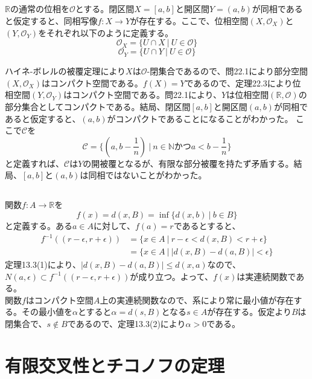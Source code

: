 \documentclass{jsarticle}
\begin{document}
\subsection{}
$\mathbb{R}$の通常の位相を$\mathcal{O}$とする。閉区間$X=[a,b]$と開区間$Y=(a,b)$が同相であると仮定すると、同相写像$f:X\to Y$が存在する。ここで、位相空間$(X,\mathcal{O}_X)$と$(Y,\mathcal{O}_Y)$をそれぞれ以下のように定義する。
\[\mathcal{O}_X=\{U\cap X\ |\ U\in\mathcal{O}\}\]
\[\mathcal{O}_Y=\{U\cap Y\ |\ U\in\mathcal{O}\}\]

ハイネ-ボレルの被覆定理により$X$は$\mathcal{O}$-閉集合であるので、問22.1により部分空間$(X,\mathcal{O}_X)$はコンパクト空間である。$f(X)=Y$であるので、定理22.3により位相空間$(Y,\mathcal{O}_Y)$はコンパクト空間である。問22.1により、$Y$は位相空間$(\mathbb{R},\mathcal{O})$の部分集合としてコンパクトである。結局、閉区間$[a,b]$と開区間$(a,b)$が同相であると仮定すると、$(a,b)$がコンパクトであることになることがわかった。
ここで$\mathcal{C}$を
\[\mathcal{C}=\{(a,b-\frac{1}{n})\ |\ n\in\mathbb{N}かつa<b-\frac{1}{n}\}\]
と定義すれば、$\mathcal{C}$は$Y$の開被覆となるが、有限な部分被覆を持たず矛盾する。結局、$[a,b]$と$(a,b)$は同相ではないことがわかった。


\subsection{}
関数$f:A\to\mathbb{R}$を
\[f(x)=d(x,B)=\inf\{d(x,b)\ |\ b\in B\}\]
と定義する。ある$a\in A$に対して、$f(a)=r$であるとすると、
\begin{align*}
f^{-1}((r-\epsilon,r+\epsilon))&=\{x\in A\ |\ r-\epsilon < d(x,B) < r+\epsilon\}\\
&=\{x\in A\ |\  |d(x,B)-d(a,B)|<\epsilon\}
\end{align*}
定理13.3(1)により、$|d(x,B)-d(a,B)|\leq d(x,a)$なので、$N(a,\epsilon)\subset f^{-1}((r-\epsilon,r+\epsilon))$が成り立つ。よって、$f(x)$は実連続関数である。\\
関数$f$はコンパクト空間$A$上の実連続関数なので、系により常に最小値が存在する。その最小値を$\alpha$とすると$\alpha=d(s,B)$となる$s\in A$が存在する。仮定より$B$は閉集合で、$s\notin B$であるので、定理13.3(2)により$\alpha>0$である。









\section{有限交叉性とチコノフの定理}
\end{document}
